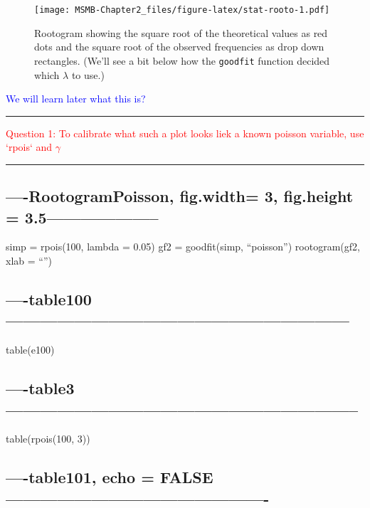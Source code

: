 \documentclass[]{article}
\begin{document}
\begin{figure}
\centering
\texttt{[image: MSMB-Chapter2\_files/figure-latex/stat-rooto-1.pdf]}
\caption{Rootogram showing the square root of the theoretical values as
red dots and the square root of the observed frequencies as drop down
rectangles. (We'll see a bit below how the \texttt{goodfit} function
decided which \(\lambda\) to use.)}
\end{figure}

\textcolor{blue}{We will learn later what this is?}

\begin{center}\rule{0.5\linewidth}{\linethickness}\end{center}

\textcolor{red}{Question 1: To calibrate what such a plot looks liek a known poisson variable, use `rpois` and $\gamma$}

\begin{center}\rule{0.5\linewidth}{\linethickness}\end{center}

\subsection{----RootogramPoisson, fig.width= 3, fig.height =
3.5--------------------}\label{rootogrampoisson-fig.width-3-fig.height-3.5}

simp = rpois(100, lambda = 0.05) gf2 = goodfit(simp, ``poisson'')
rootogram(gf2, xlab = ``'')

\subsection{----table100------------------------------------------------------------}\label{table100}

table(e100)

\subsection{----table3--------------------------------------------------------------}\label{table3}

table(rpois(100, 3))

\subsection{----table101, echo =
FALSE----------------------------------------------}\label{table101-echo-false-}
\end{document}
